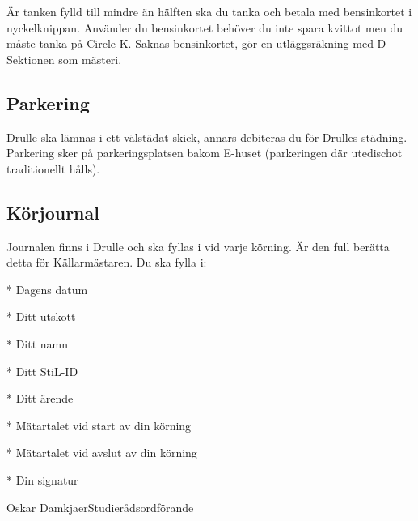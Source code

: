 \documentclass{dsekkallelse}
\begin{document}
Är tanken fylld till mindre än hälften ska du tanka och betala med bensinkortet i nyckelknippan. Använder du bensinkortet behöver du inte spara kvittot men du måste tanka på Circle K. Saknas bensinkortet, gör en utläggsräkning med D-Sektionen som mästeri.

\subsection{Parkering}
Drulle ska lämnas i ett välstädat skick, annars debiteras du för Drulles städning.
Parkering sker på parkeringsplatsen bakom E-huset (parkeringen där utedischot traditionellt hålls).

\newpage

\subsection{ Körjournal}

Journalen finns i Drulle och ska fyllas i vid varje körning. Är den full berätta detta för Källarmästaren. Du ska fylla i:

*   Dagens datum

*   Ditt utskott

*   Ditt namn

*   Ditt StiL-ID

*   Ditt ärende

*   Mätartalet vid start av din körning

*   Mätartalet vid avslut av din körning

*   Din signatur


\signature{För Styrelsen}{Oskar Damkjaer}{Studierådsordförande}
\end{document}
